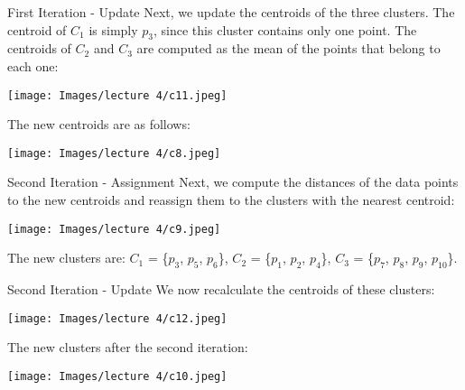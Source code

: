 \documentclass[xcolor=dvipsnames, 9pt]{beamer} %
\begin{document}
\begin{frame}{First Iteration - Update}
Next, we update the centroids of the three clusters. The centroid of $C_{1}$ is simply $p_{3}$, since this cluster contains only one point. The centroids of $C_{2}$ and $C_{3}$ are computed as the mean of the points that belong to each one:
\begin{center}
\texttt{[image: Images/lecture 4/c11.jpeg]} 
\end{center}

The new centroids are as follows:
\begin{center}
\texttt{[image: Images/lecture 4/c8.jpeg]} 
\end{center}
\end{frame}

\begin{frame}{Second Iteration - Assignment}
Next, we compute the distances of the data points to the new centroids and reassign them to the clusters with the nearest centroid:
\begin{center}
\texttt{[image: Images/lecture 4/c9.jpeg]} 
\end{center}
The new clusters are: $C_{1}$ = \{$p_{3}$, $p_{5}$, $p_{6}$\}, $C_{2}$ = \{$p_{1}$, $p_{2}$, $p_{4}$\}, $C_{3}$ = \{$p_{7}$, $p_{8}$, $p_{9}$, $p_{10}$\}.
\end{frame}

\begin{frame}{Second Iteration - Update}
We now recalculate the centroids of these clusters:
\begin{center}
\texttt{[image: Images/lecture 4/c12.jpeg]} 
\end{center}

The new clusters after the second iteration:
\begin{center}
\texttt{[image: Images/lecture 4/c10.jpeg]} 
\end{center}
\end{frame}
\end{document}
